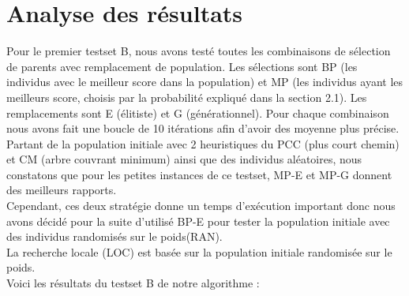 \documentclass[12pt,a4paper]{article}
\begin{document}
\section{Analyse des résultats}
Pour le premier testset B, nous avons testé toutes les combinaisons de sélection de parents avec remplacement de population. Les sélections sont BP (les individus avec le meilleur score dans la population) et MP (les individus ayant les meilleurs score, choisis par la probabilité expliqué dans la section 2.1). Les remplacements sont E (élitiste) et G (générationnel). Pour chaque combinaison nous avons fait une boucle de 10 itérations afin d'avoir des moyenne plus précise. Partant de la population initiale avec 2 heuristiques du PCC (plus court chemin) et CM (arbre couvrant minimum) ainsi que des individus aléatoires, nous constatons que pour les petites instances de ce testset, MP-E et MP-G donnent des meilleurs rapports.\\
Cependant, ces deux stratégie donne un temps d'exécution important donc nous avons décidé pour la suite d'utilisé BP-E pour tester la population initiale avec des individus randomisés sur le poids(RAN).\\
La recherche locale (LOC) est basée sur la population initiale randomisée sur le poids.\\
Voici les résultats du testset B de notre algorithme :
\end{document}
